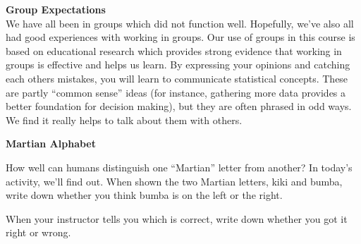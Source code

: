
 {\bf Group Expectations }\\
 We have all been in groups which did not function well.  Hopefully,
 we've also all had good experiences with working in groups.  Our use
 of groups in this course is based on educational research which
 provides strong evidence that working in groups is effective and helps
 us learn.  By expressing your opinions and catching each others
 mistakes, you will learn to communicate statistical concepts.  These
 are partly ``common sense''
 ideas (for instance, gathering more data provides a better foundation
 for decision making),  but they are often  phrased in
 odd ways. We find it really helps to talk about them  with
 others. 



\newpage
 \def\theTopic{Martian Alphabet}

\begin{center}
{\bf  Martian Alphabet }\\
\end{center}
\vspace{-.2in}

How well can humans distinguish one ``Martian'' letter from another?
In today's activity, we'll find out.
When shown the two Martian letters, kiki and bumba, write down whether
you think bumba is on the left or the right. \vspace{.5cm}


When your instructor  tells you which is correct, write down whether
you got it right or wrong. \vspace{.5cm}



